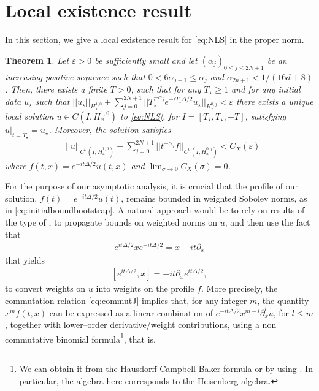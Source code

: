 \documentclass[a4paper, 15pt]{article}
\numberwithin{equation}{section}
\newtheorem{unTheorem}{Theorem}[section]
\begin{document}
\section{Local existence result}
\label{section:localexist}
In this section, we give a local existence result for \eqref{eq:NLS} in the proper norm. \\
\begin{unTheorem}
\label{unTheorem:localexist}
Let $\varepsilon>0$ be sufficiently small and let $(\alpha_j)_{0\leq j\leq 2N+1}$ be an increasing positive sequence such that $0<6\alpha_{j-1}\leq\alpha_j$ and $\alpha_{2n+1}<1/(16d+8)$. Then, there exists a finite $T>0$, such that for any $T_\star\geq 1$ and for any initial data $u_\star$ such that $||u_\star||_{H^{1,0}_x}+\sum^{2N+1}_{j=0}||T_\star^{-\alpha_j}e^{-iT_\star\Delta/2}u_\star||_{H^{0,j}_x}<\varepsilon$ there exists a unique local solution $u\in C(I,H^{1,0}_x)$ to \eqref{eq:NLS}, for $I=[T_\star,T_\star,+T]$, satisfying $u|_{t=T_\star}=u_\star$. Moreover, the solution satisfies 
\begin{align}
\label{eq:initialboundbootstrap}
&||u||_{C^0(I,H^{1,0}_x)}+\sum^{2N+1}_{j=0}||t^{-\alpha_j}f||_{C^0(I,H^{0,j}_x)}<C_X(\varepsilon)
\end{align}
where $f(t,x)=e^{-it\Delta/2}u(t,x)$ and $\lim_{\sigma\to0}C_X(\sigma)=0$.
\end{unTheorem}
For the purpose of our asymptotic analysis, it is crucial that the profile of our solution, $f(t)=e^{-it\Delta/2}u(t)$, remains bounded in weighted Sobolev norms, as in \eqref{eq:initialboundbootstrap}. A natural approach would be to rely on results of the type of \cite{zbMATH04115164}, to propagate bounds on weighted norms on $u$, and then use the fact that
\begin{align}
e^{it\Delta/2}xe^{-it\Delta/2}=x-it\partial_x
\end{align}
that yields
\begin{align}
\label{eq:commutJ}
[e^{it\Delta/2},x]=-it\partial_xe^{it\Delta/2},
\end{align}
to convert weights on $u$ into weights on the profile $f$. More precisely, the commutation relation \eqref{eq:commutJ} implies that, for any integer $m$, the quantity $x^mf(t,x)$ can be expressed as a linear combination of $e^{-it\Delta/2}x^{m-l}\partial^l_xu$, for $l\leq m$, together with lower–order derivative/weight contributions, using a non commutative binomial formula\footnote{We can obtain it from the Hausdorff-Campbell-Baker formula or by using \cite{arXiv:1707.03861}. In particular, the algebra here corresponds to the Heisenberg algebra.}, that is, 
\end{document}
